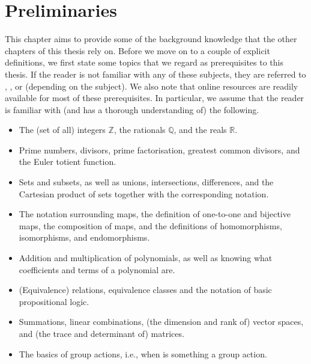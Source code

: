 \documentclass[openany, a4paper, 10pt]{book}
\theoremstyle{plain}
\theoremstyle{plain}
\theoremstyle{plain}
\theoremstyle{definition}
\theoremstyle{plain}
\theoremstyle{definition}
\theoremstyle{remark}
\begin{document}
\chapter{Preliminaries}\label{chap:prelim}
This chapter aims to provide some of the background knowledge that the other chapters of this thesis rely on.
Before we move on to a couple of explicit definitions, we first state some topics that we regard as prerequisites to this thesis.
If the reader is not familiar with any of these subjects, they are referred to \cite{dictaat_dion}, \cite{dictaat_algebra_1}, or \cite{analysis} (depending on the subject).
We also note that online resources are readily available for most of these prerequisites.
In particular, we assume that the reader is familiar with (and has a thorough understanding of) the following.
\begin{itemize}
    \item The (set of all) integers $\mathbb Z$, the rationals $\mathbb Q$, and the reals $\mathbb R$.
    \item Prime numbers, divisors, prime factorisation, greatest common divisors, and the Euler totient function.
    \item Sets and subsets, as well as unions, intersections, differences, and the Cartesian product of sets together with the corresponding notation.
    \item The notation surrounding maps, the definition of one-to-one and bijective maps, the composition of maps, and the definitions of homomorphisms, isomorphisms, and endomorphisms.
    \item Addition and multiplication of polynomials, as well as knowing what coefficients and terms of a polynomial are.
    \item (Equivalence) relations, equivalence classes and the notation of basic propositional logic.
    \item Summations, linear combinations, (the dimension and rank of) vector spaces, and (the trace and determinant of) matrices.
    \item The basics of group actions, i.e., when is something a group action.
\end{itemize}
\end{document}
